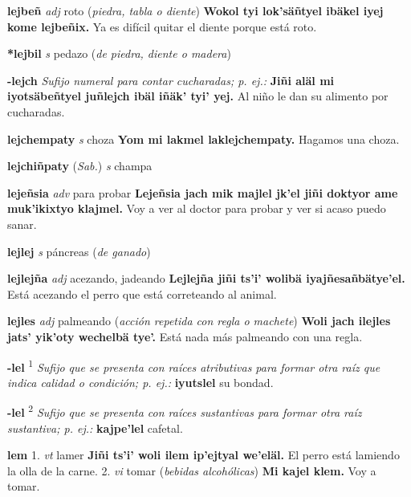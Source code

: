 \documentclass[10pt]{scrbook}
\newcommand{\entry}[1]{\textbf{#1}}
\newcommand{\onedefinition}[1]{#1.}
\newcommand{\defsuperscript}[1]{\textsuperscript{#1}}
\newcommand{\nontranslationdef}[1]{\textit{#1}}
\newcommand{\partofspeech}[1]{\textit{#1}}
\newcommand{\spanishtranslation}[1]{#1}
\newcommand{\clarification}[1]{(\textit{#1})}
\newcommand{\cholexample}[1]{\textbf{#1}}
\newcommand{\exampletranslation}[1]{#1}
\newcommand{\relevantdialect}[1]{(\textit{#1})}
\begin{document}
\begin{multicols}{2}
\entry{lejbeñ}
\partofspeech{adj}
\spanishtranslation{roto}
\clarification{piedra, tabla o diente}
\cholexample{Wokol tyi lok'säñtyel ibäkel iyej kome lejbeñix.}
\exampletranslation{Ya es difícil quitar el diente porque está roto.}

\entry{*lejbil}
\partofspeech{s}
\spanishtranslation{pedazo}
\clarification{de piedra, diente o madera}

\entry{-lejch}
\nontranslationdef{Sufijo numeral para contar cucharadas; p. ej.:}
\cholexample{Jiñi aläl mi iyotsäbeñtyel juñlejch ibäl iñäk' tyi' yej.}
\exampletranslation{Al niño le dan su alimento por cucharadas.}

\entry{lejchempaty}
\partofspeech{s}
\spanishtranslation{choza}
\cholexample{Yom mi lakmel laklejchempaty.}
\exampletranslation{Hagamos una choza.}

\entry{lejchiñpaty}
\relevantdialect{Sab.}
\partofspeech{s}
\spanishtranslation{champa}

\entry{lejeñsia}
\partofspeech{adv}
\spanishtranslation{para probar}
\cholexample{Lejeñsia jach mik majlel jk'el jiñi doktyor ame muk'ikixtyo klajmel.}
\exampletranslation{Voy a ver al doctor para probar y ver si acaso puedo sanar.}

\entry{lejlej}
\partofspeech{s}
\spanishtranslation{páncreas}
\clarification{de ganado}

\entry{lejlejña}
\partofspeech{adj}
\spanishtranslation{acezando, jadeando}
\cholexample{Lejlejña jiñi ts'i' wolibä iyajñesañbätye'el.}
\exampletranslation{Está acezando el perro que está correteando al animal.}

\entry{lejles}
\partofspeech{adj}
\spanishtranslation{palmeando}
\clarification{acción repetida con regla o machete}
\cholexample{Woli jach ilejles jats' yik'oty wechelbä tye'.}
\exampletranslation{Está nada más palmeando con una regla.}

\entry{-lel}
\defsuperscript{1}
\nontranslationdef{Sufijo que se presenta con raíces atributivas para formar otra raíz que indica calidad o condición; p. ej.:}
\cholexample{iyutslel}
\exampletranslation{su bondad.}

\entry{-lel}
\defsuperscript{2}
\nontranslationdef{Sufijo que se presenta con raíces sustantivas para formar otra raíz sustantiva; p. ej.:}
\cholexample{kajpe'lel}
\exampletranslation{cafetal.}

\entry{lem}
\onedefinition{1}
\partofspeech{vt}
\spanishtranslation{lamer}
\cholexample{Jiñi ts'i' woli ilem ip'ejtyal we'eläl.}
\exampletranslation{El perro está lamiendo la olla de la carne.}
\onedefinition{2}
\partofspeech{vi}
\spanishtranslation{tomar}
\clarification{bebidas alcohólicas}
\cholexample{Mi kajel klem.}
\exampletranslation{Voy a tomar.}


\end{multicols}
\end{document}
